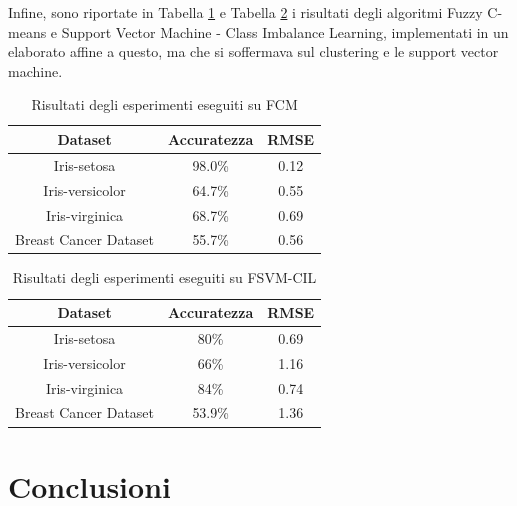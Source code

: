 \documentclass[11pt,  oneside, openany]{book}
\begin{document}
Infine, sono riportate in Tabella \ref{tab:fcm} e Tabella \ref{tab:fsvm} i risultati degli algoritmi Fuzzy C-means e Support Vector Machine - Class Imbalance Learning, implementati in un elaborato affine a questo, ma che si soffermava sul clustering e le support vector machine. 

\begin{table}

    \begin{center}\begin{tabular}{ |c|c|c| } 
        \hline
        \textbf{Dataset} & \textbf{Accuratezza} & \textbf{RMSE}\\
        \hline
        Iris-setosa & 98.0\% & 0.12\\
        \hline
        Iris-versicolor & 64.7\% & 0.55\\
        \hline
        Iris-virginica & 68.7\% & 0.69\\
        \hline
        Breast Cancer Dataset &  55.7\% & 0.56\\
        \hline                  
      \end{tabular}
    \end{center}
    \caption{Risultati degli esperimenti eseguiti su FCM}
    \label{tab:fcm}  
    \end{table}

\begin{table}
      \begin{center}\begin{tabular}{ |c|c|c| } 
        \hline
        Dataset & Accuratezza & RMSE\\
        \hline
        Iris-setosa & 80\% & 0.69\\
        \hline
        Iris-versicolor & 66\% & 1.16\\
        \hline
        Iris-virginica & 84\% & 0.74\\
        \hline
        Breast Cancer Dataset &  53.9\% & 1.36\\
        \hline                  
      \end{tabular}
    \end{center}
      \caption{Risultati degli esperimenti eseguiti su FSVM-CIL}
    \label{tab:fsvm}  
    \end{table}


	\chapter*{Conclusioni}
\end{document}
